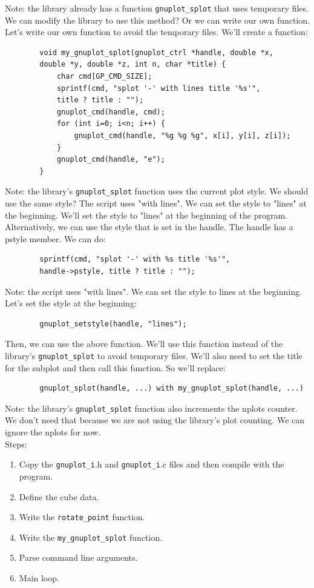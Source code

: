\documentclass[a4paper,10pt]{article}
\begin{document}
Note: the library already has a function \verb|gnuplot_splot| that uses temporary files. We can modify the library to use this method? Or we can write our own function. Let's write our own function to avoid the temporary files.
We'll create a function:
\begin{verbatim}
        void my_gnuplot_splot(gnuplot_ctrl *handle, double *x,
        double *y, double *z, int n, char *title) {
            char cmd[GP_CMD_SIZE];
            sprintf(cmd, "splot '-' with lines title '%s'",
            title ? title : "");
            gnuplot_cmd(handle, cmd);
            for (int i=0; i<n; i++) {
                gnuplot_cmd(handle, "%g %g %g", x[i], y[i], z[i]);
            }
            gnuplot_cmd(handle, "e");
        }
\end{verbatim}
Note: the library's \verb|gnuplot_splot| function uses the current plot style. We should use the same style? The script uses "with lines". We can set the style to "lines" at the beginning.
We'll set the style to "lines" at the beginning of the program.
Alternatively, we can use the style that is set in the handle. The handle has a pstyle member.
We can do:
\begin{verbatim}
        sprintf(cmd, "splot '-' with %s title '%s'",
        handle->pstyle, title ? title : "");
\end{verbatim}
Note: the script uses "with lines". We can set the style to lines at the beginning.
Let's set the style at the beginning:
\begin{verbatim}
        gnuplot_setstyle(handle, "lines");
\end{verbatim}
Then, we can use the above function.
We'll use this function instead of the library's \verb|gnuplot_splot| to avoid temporary files.
We'll also need to set the title for the subplot and then call this function.
So we'll replace:
\begin{verbatim}
        gnuplot_splot(handle, ...) with my_gnuplot_splot(handle, ...)
\end{verbatim}
Note: the library's \verb|gnuplot_splot| function also increments the nplots counter. We don't need that because we are not using the library's plot counting. We can ignore the nplots for now.\\
Steps:
\begin{enumerate}
 \item Copy the \verb|gnuplot_i|.h and \verb|gnuplot_i|.c files and then compile with the program.
 \item Define the cube data.
 \item Write the \verb|rotate_point| function.
 \item Write the \verb|my_gnuplot_splot| function.
 \item Parse command line arguments.
 \item Main loop.
\end{enumerate}
\end{document}

